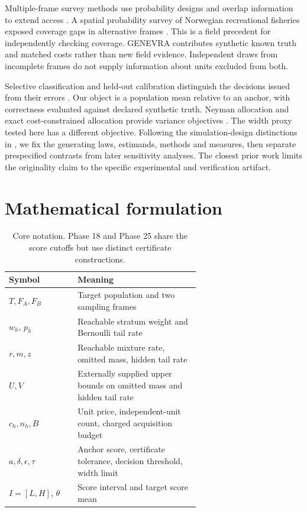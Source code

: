 \documentclass[article,nojss]{jss}
\begin{document}
Multiple-frame survey methods use probability designs and overlap
information to extend access \citep{lohr2006}. A spatial probability
survey of Norwegian recreational fisheries exposed coverage gaps in
alternative frames \citep{volstad2020}. This is a field precedent for
independently checking coverage. GENEVRA contributes synthetic known
truth and matched costs rather than new field evidence. Independent
draws from incomplete frames do not supply information about units
excluded from both.

Selective classification and held-out calibration distinguish the
decisions issued from their errors \citep{geifman2017,angelopoulos2025}.
Our object is a population mean relative to an anchor, with correctness
evaluated against declared synthetic truth. Neyman allocation and exact
cost-constrained allocation provide variance objectives
\citep{neyman1934,wright2019}. The width proxy tested here has a
different objective. Following the simulation-design distinctions in
\citet{morris2019}, we fix the generating laws,
estimands, methods and measures, then separate prespecified contrasts
from later sensitivity analyses. The closest prior work limits the
originality claim to the specific experimental and verification
artifact.

\section{Mathematical formulation}

\begin{table}[htbp]
\centering
\small
\begin{tabular}{lp{0.64\linewidth}}
\hline
Symbol & Meaning \\
\hline
\(T, F_A, F_B\) & Target population and two sampling frames \\
\(w_h\), \(p_h\) & Reachable stratum weight and Bernoulli tail rate \\
\(r, m, z\) & Reachable mixture rate, omitted mass, hidden tail rate \\
\(U, V\) & Externally supplied upper bounds on omitted mass and hidden tail rate \\
\(c_h, n_h, B\) & Unit price, independent-unit count, charged acquisition budget \\
\(a, \delta, \epsilon, \tau\) & Anchor score, certificate tolerance, decision threshold, width limit \\
\(I=[L,H]\), \ensuremath{\theta} & Score interval and target score mean \\
\hline
\end{tabular}
\caption{Core notation. Phase 18 and Phase 25 share the score cutoffs but use distinct certificate constructions.}
\label{tab:notation}
\end{table}
\end{document}
